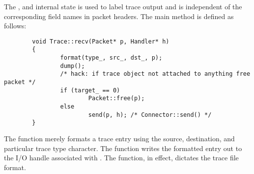 The , and  internal state is used
to label trace output and is independent of the corresponding field
names in packet headers.
The main  method is defined as follows:
\begin{small}
\begin{verbatim}
        void Trace::recv(Packet* p, Handler* h)
        {
                format(type_, src_, dst_, p);
                dump();
                /* hack: if trace object not attached to anything free packet */
                if (target_ == 0)
                        Packet::free(p);
                else
                        send(p, h); /* Connector::send() */
        }
\end{verbatim}
\end{small}
The function merely formats a trace entry using the source, destination,
and particular trace type character.
The  function writes the formatted entry out to the
I/O handle associated with .
The  function, in effect, dictates the trace file format.

\subsection{}

